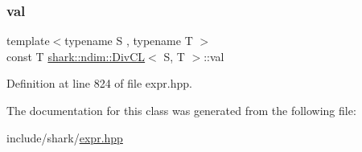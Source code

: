 \subsubsection{\texorpdfstring{val}{val}}
{\footnotesize\ttfamily template$<$typename S , typename T $>$ \\
const T \hyperlink{classshark_1_1ndim_1_1_div_c_l}{shark\+::ndim\+::\+Div\+CL}$<$ S, T $>$\+::val\hspace{0.3cm}{\ttfamily [private]}}



Definition at line 824 of file expr.\+hpp.



The documentation for this class was generated from the following file\+:\begin{DoxyCompactItemize}
\item 
include/shark/\hyperlink{expr_8hpp}{expr.\+hpp}\end{DoxyCompactItemize}
